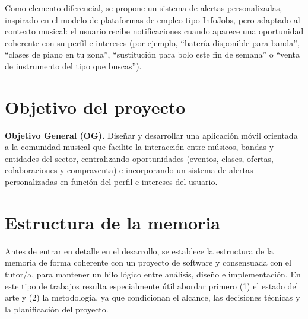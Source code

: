 \documentclass[12pt,a4paper]{report}
\begin{document}
Como elemento diferencial, se propone un sistema de alertas personalizadas, inspirado en el modelo de plataformas de empleo tipo InfoJobs, pero adaptado al contexto musical: el usuario recibe notificaciones cuando aparece una oportunidad coherente con su perfil e intereses (por ejemplo, ``batería disponible para banda'', ``clases de piano en tu zona'', ``sustitución para bolo este fin de semana'' o ``venta de instrumento del tipo que buscas'').

\section{Objetivo del proyecto}
\textbf{Objetivo General (OG).} Diseñar y desarrollar una aplicación móvil orientada a la comunidad musical que facilite la interacción entre músicos, bandas y entidades del sector, centralizando oportunidades (eventos, clases, ofertas, colaboraciones y compraventa) e incorporando un sistema de alertas personalizadas en función del perfil e intereses del usuario.

\section{Estructura de la memoria}
Antes de entrar en detalle en el desarrollo, se establece la estructura de la memoria de forma coherente con un proyecto de software y consensuada con el tutor/a, para mantener un hilo lógico entre análisis, diseño e implementación. En este tipo de trabajos resulta especialmente útil abordar primero (1) el estado del arte y (2) la metodología, ya que condicionan el alcance, las decisiones técnicas y la planificación del proyecto.
\end{document}
